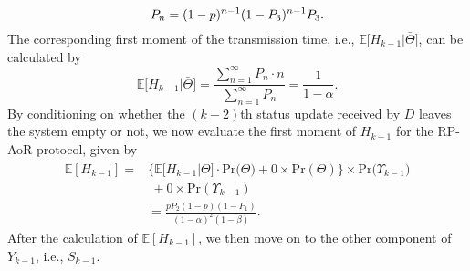 \documentclass{IEEEtran}
\begin{document}
\vspace{-0.02cm}
\begin{equation}
P_{n}=(1-p)^{n-1}(1-P_3)^{n-1}P_3.
\vspace{-0.01cm}
\end{equation}
The corresponding first moment of the transmission time, i.e., $\mathbb{E}\big[H_{k-1}|\bar{\Theta}\big]$, can be calculated by
\vspace{-0.01cm}
\begin{equation}
\mathbb{E}\big[H_{k-1}|\bar{\Theta}\big]=\frac{\sum_{n=1}^{\infty}P_n\cdot n}{\sum_{n=1}^{\infty}P_n}=\frac{1}{1-\alpha}.
\end{equation}
By conditioning on whether the $(k-2)$th status update received by $D$ leaves the system empty or not, we now evaluate the first moment of $H_{k-1}$ for the RP-AoR protocol, given by
\begin{equation}\label{H}
	\begin{aligned}
		\mathbb{E}[H_{k-1}]\!=&\Big\{\mathbb{E}\big[H_{k-1}|\bar{\Theta}\big]\cdot \mathrm{Pr}\big(\bar{\Theta}\big)+0 \times \mathrm{Pr}(\Theta)\Big\}\times \mathrm{Pr}\big(\bar{\Upsilon}_{k-1}\big)\\
		&\ +0 \times \mathrm{Pr}(\Upsilon_{k-1})\\
		&\!\!\!\!\!\!=\frac{p P_2(1-p)(1-P_1)}{(1-\alpha)^2(1-\beta)}.
	\end{aligned}
\end{equation}
%
%
%
%
After the calculation of $\mathbb{E}[H_{k-1}]$, we then move on to the other component of $Y_{k-1}$, i.e., $S_{k-1}$.

\end{document}

